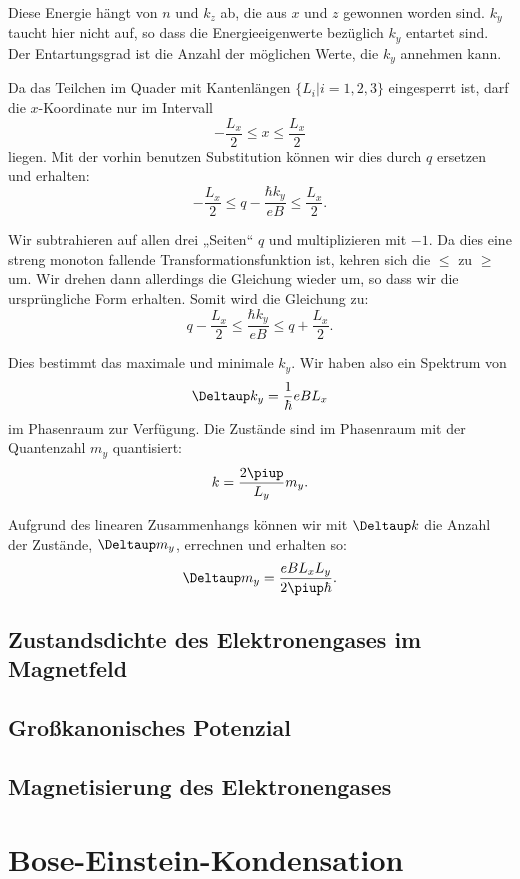 Diese Energie hängt von $n$ und $k_z$ ab, die aus $x$ und $z$ gewonnen worden
sind. $k_y$ taucht hier nicht auf, so dass die Energieeigenwerte bezüglich
$k_y$ entartet sind. Der Entartungsgrad ist die Anzahl der möglichen Werte, die
$k_y$ annehmen kann.

Da das Teilchen im Quader mit Kantenlängen $\{ L_i | i = 1, 2, 3 \}$
eingesperrt ist, darf die $x$-Koordinate nur im Intervall
\[
    - \frac{L_x}2 \leq x \leq \frac{L_x}2
\]
liegen. Mit der vorhin benutzen Substitution können wir dies durch $q$ ersetzen
und erhalten:
\[
    - \frac{L_x}2 \leq q - \frac{\hbar k_y}{eB} \leq \frac{L_x}2.
\]

Wir subtrahieren auf allen drei „Seiten“ $q$ und multiplizieren mit $-1$. Da
dies eine streng monoton fallende Transformationsfunktion ist, kehren sich die
$\leq$ zu $\geq$ um. Wir drehen dann allerdings die Gleichung wieder um, so
dass wir die ursprüngliche Form erhalten. Somit wird die Gleichung zu:
\[
    q - \frac{L_x}2 \leq \frac{\hbar k_y}{eB} \leq q + \frac{L_x}2.
\]

Dies bestimmt das maximale und minimale $k_y$. Wir haben also ein Spektrum von
\[
    \Deltaup k_y = \frac1\hbar e B L_x
\]
im Phasenraum zur Verfügung. Die Zustände sind im Phasenraum mit der
Quantenzahl $m_y$ quantisiert:
\[
    k = \frac{2\piup}{L_y} m_y.
\]

Aufgrund des linearen Zusammenhangs können wir mit $\Deltaup k$ die Anzahl der
Zustände, $\Deltaup m_y$, errechnen und erhalten so:
\[
    \Deltaup m_y = \frac{e B L_x L_y}{2 \piup \hbar}.
\]

\subsection{Zustandsdichte des Elektronengases im Magnetfeld}

\fehlt

\subsection{Großkanonisches Potenzial}

\fehlt

\subsection{Magnetisierung des Elektronengases}

\fehlt

\section{Bose-Einstein-Kondensation}

